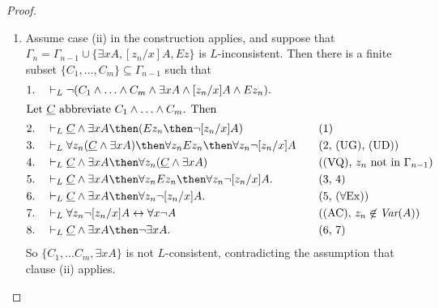 \documentclass[11pt]{woarticle}
\theoremstyle{break}
\theoremstyle{nonumberplain}
\newcommand{\1}{\;\,|\;\,}
\newcommand{\var}{\emph{Var}}
\renewcommand{\vec}[1]{\ensuremath{\underline{#1}}}
\newcommand{\T}[1]{\ensuremath{(\mathrm{ #1})}}
\begin{document}
\begin{proof}
\begin{enumerate}
\begin{enumerate}
    \item Assume case (ii) in the construction applies, and suppose
      that $\Gamma_n = \Gamma_{n-1} \cup \{ \exists x A, [z_n/x]A, Ez
      \}$ is $L$-inconsistent. Then there is a finite subset $\{
      C_1,\ldots,C_m \} \subseteq \Gamma_{n-1}$ such that
      \begin{alignat*}{2}
        1.\quad& \vdash_{L} \neg (C_1 \land \ldots \land C_m \land
        \exists x A \land [z_n/x]A \land Ez_n). &\quad&\\
      \intertext{Let $\vec{C}$ abbreviate $C_1 \land \ldots \land C_m$. Then}
        2.\quad&\vdash_{L} \vec{C} \land \exists x
        A \then (Ez_n \then \neg [z_n/x]A) &&\text{(1)}\\
        3.\quad&\vdash_{L} \forall z_n(\vec{C} \land 
        \exists x A) \then \forall z_n Ez_n \then \forall z_n\neg [z_n/x]A
        &&\text{(2, \T{UG}, \T{UD})}\\
        4.\quad&\vdash_L \vec{C} \land \exists x A 
        \then \forall z_n(\vec{C} \land \exists x A)
        &&\text{(\T{VQ}, $z_n$ not in $\Gamma_{n-1}$)}\\
        5.\quad&\vdash_{L} \vec{C} \land \exists x A \then
        \forall z_n Ez_n \then \forall z_n\neg [z_n/x]A.
        &&\text{(3, 4)}\\
        6.\quad& \vdash_{L} \vec{C} \land \exists x A \then
        \forall z_n \neg [z_n/x]A.
        &&\text{(5, \T{\forall Ex})}\\
        7.\quad& \vdash_{L} \forall z_n \neg [z_n/x] A \leftrightarrow \forall x \neg A 
        && \text{(\T{AC}, $z_n \not\in \var(A)$)}\\
        8.\quad& \vdash_{L} \vec{C} \land \exists x A 
        \then \neg \exists x A.&& \text{(6, 7)}
      \end{alignat*}
      So $\{ C_1,\ldots C_m, \exists x A \}$ is not
      $L$-consistent, contradicting the assumption that clause
      (ii) applies.


\end{enumerate}
\end{enumerate}
\end{proof}
\end{document}
